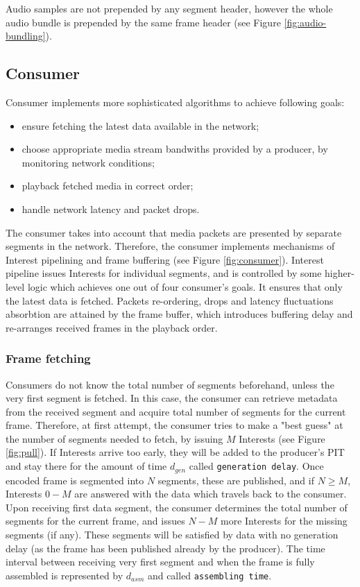 \documentclass{icn/sig-alternate-2012} %
\begin{document}
Audio samples are not prepended by any segment header, however the whole audio bundle is prepended by the same frame header (see Figure \ref{fig:audio-bundling}).

\subsection{Consumer}

Consumer implements more sophisticated algorithms to achieve following goals:
\begin{itemize}
\item ensure fetching the latest data available in the network; 
\item choose appropriate media stream bandwiths provided by a producer, by monitoring network conditions;
\item playback fetched media in correct order;
\item handle network latency and packet drops.
\end{itemize}

The consumer takes into account that media packets are presented by separate segments in the network. Therefore, the consumer implements mechanisms of Interest pipelining and frame buffering (see Figure \ref{fig:consumer}). Interest pipeline issues Interests for individual segments, and is controlled by some higher-level logic which achieves one out of four consumer's goals. It ensures that only the latest data is fetched. Packets re-ordering, drops and latency fluctuations absorbtion are attained by the frame buffer, which introduces buffering delay and re-arranges received frames in the playback order.



\subsubsection{Frame fetching}

Consumers do not know the total number of segments beforehand, unless the very first segment is fetched. In this case, the consumer can retrieve metadata from the received segment and acquire total number of segments for the current frame. 
Therefore, at first attempt, the consumer tries to make a "best guess" at the number of segments needed to fetch, by issuing $M$ Interests (see Figure \ref{fig:pull}). If Interests arrive too early, they will be added to the producer's PIT and stay there for the amount of time $d_{gen}$ called \texttt{generation delay}. Once encoded frame is segmented into $N$ segments, these are published, and if $N\geq M$, Interests $0 - M$ are answered with the data which travels back to the consumer. Upon receiving first data segment, the consumer determines the total number of segments for the current frame, and issues $N - M$ more Interests for the missing segments (if any). These segments will be satisfied by data with no generation delay (as the frame has been published already by the producer). The time interval between receiving very first segment and when the frame is fully assembled is represented by $d_{asm}$ and called \texttt{assembling time}.
\end{document}
